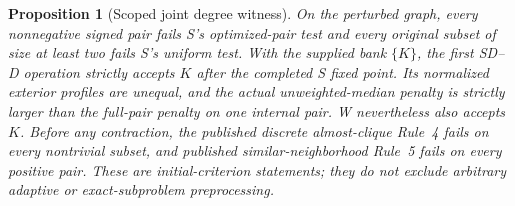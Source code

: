 \documentclass[sigconf,anonymous,review]{acmart}
\newtheorem{proposition}{Proposition}
\newcommand{\1}{\mathbf{1}}
\begin{document}
\begin{proposition}[Scoped joint degree witness]\label{prop:sd-connected}
On the perturbed graph, every nonnegative signed pair fails S's optimized-pair
test and every original subset of size at least two fails S's uniform test.
With the supplied bank $\{K\}$, the first SD--D operation strictly
accepts $K$ after the completed S fixed point. Its normalized exterior
profiles are unequal, and the actual unweighted-median penalty is strictly
larger than the full-pair penalty on one internal pair. W nevertheless also
accepts $K$. Before any contraction, the published discrete almost-clique
Rule~4 fails on every nontrivial subset, and published similar-neighborhood
Rule~5 fails on every positive pair. These are initial-criterion statements;
they do not exclude arbitrary adaptive or exact-subproblem preprocessing.
\end{proposition}
\end{document}
